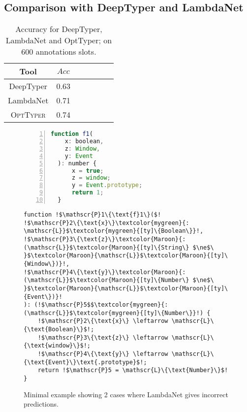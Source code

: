 \documentclass[acmsmall, review, anonymous]{acmart}\settopmatter{printfolios=true,printccs=false,printacmref=false}
\newcommand{\projectname}{\textsc{OptTyper}\xspace}
\begin{document}
\subsection{Comparison with DeepTyper and  LambdaNet}\label{ssec:typesubproblem}

\begin{table*}[t]
	\centering
	\caption{Accuracy for DeepTyper, LambdaNet and OptTyper; on $600$ annotations slots.}
		\label{tab:typeacc2}
	\begin{tabular}{ccccccc}
		\toprule
		Tool   &                              $Acc$ \\
		\midrule
		DeepTyper  & 0.63 \\
		LambdaNet  & 0.71 \\
		\projectname & 0.74\\
		\bottomrule
	\end{tabular}
\end{table*}
\begin{figure}[!t]
    \centering
    \begin{minipage}[t]{.38\textwidth}
        \raggedright
\begin{lstlisting}[language=JavaScript,label={lst:gold}, numbers=left]
  function f1(
    x: boolean,
    z: Window,
    y: Event
  ): number {
      x = true;
      z = window;
      y = Event.prototype;
      return 1;
  }
\end{lstlisting}
   \vspace{-5mm}
    \end{minipage}
    \begin{minipage}[t]{.57\textwidth}
        \raggedleft
\begin{lstlisting}[language=Fake,label={lst:lncode}] 
function !$\mathscr{P}1\{\text{f}1\}($!
!$\mathscr{P}2\{\text{x}\}\textcolor{mygreen}{: \mathscr{L}}$\textcolor{mygreen}{[ty]\{Boolean\}}!,
!$\mathscr{P}3\{\text{z}\}\textcolor{Maroon}{: (\mathscr{L}}$\textcolor{Maroon}{[ty]\{String\} $\ne$\ }$\textcolor{Maroon}{\mathscr{L}}$\textcolor{Maroon}{[ty]\{Window\})}!,
!$\mathscr{P}4\{\text{y}\}\textcolor{Maroon}{: (\mathscr{L}}$\textcolor{Maroon}{[ty]\{Number\} $\ne$\ }$\textcolor{Maroon}{\mathscr{L}}$\textcolor{Maroon}{[ty]\{Event\})}!
): (!$\mathscr{P}5$$\textcolor{mygreen}{: (\mathscr{L}}$\textcolor{mygreen}{[ty]\{Number\}}!) {
    !$\mathscr{P}2\{\text{x}\} \leftarrow \mathscr{L}\{\text{Boolean}\}$!;
    !$\mathscr{P}3\{\text{z}\} \leftarrow \mathscr{L}\{\text{window}\}$!;
    !$\mathscr{P}4\{\text{y}\} \leftarrow \mathscr{L}\{\text{Event}\}\text{.prototype}$!;
    return !$\mathscr{P}5 = \mathscr{L}\{\text{Number}\}$!
}
\end{lstlisting}
    \vspace{-5mm}
    \end{minipage}
    \caption{Minimal example showing 2 cases where LambdaNet gives incorrect predictions.}\label{fig:LambdaNet}
\end{figure}
\end{document}
